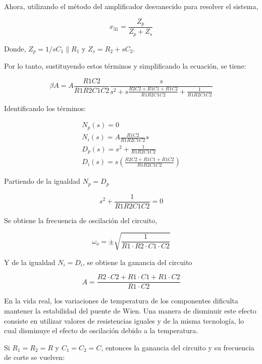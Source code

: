 Ahora, utilizando el método del amplificador desvanecido para resolver el sistema,

\begin{equation}
  x_{31} = \frac{Z_p}{Z_p + Z_s}
\end{equation}

Donde, $Z_p= 1/sC_1 \parallel R_1$ y $Z_s=R_2 + sC_2$.

Por lo tanto, sustituyendo estos términos y simplificando la ecuación, se tiene:

\begin{equation}
  \beta A = A \frac{R1C2}{R1R2C1C2} \frac{s}{s^2 + s \frac{R2C2 + R1C1 + R1C2}{R1R2C1C2} + \frac{1}{R1R2C1C2}}
\end{equation}

Identificando los términos:


\begin{align}
  N_p(s) = 0 \\
  N_i(s) = A \frac{R1C2}{R1R2C1C2}s \\
  D_p(s) = s^2 + \frac{1}{R1R2C1C2} \\
  D_i(s) = s \left( \frac{R2C2 + R1C1 + R1C2}{R1R2C1C2} \right)
\end{align}

Partiendo de la igualdad $N_p = D_p$


\begin{equation}
  s^2 + \frac{1}{R1R2C1C2} = 0
\end{equation}

Se obtiene la frecuencia de oscilación del circuito,

\begin{equation}
  \omega_o = \pm \sqrt{\frac{1}{R1 \cdot R2 \cdot C1 \cdot C2}}
\end{equation}

Y de la igualdad $N_i = D_i$, se obtiene la ganancia del circuito

\begin{equation}
  A = \frac{R2 \cdot C2 + R1 \cdot C1 + R1 \cdot C2}{R1 \cdot C2}
\end{equation}

En la vida real, los variaciones de temperatura de los componentes dificulta mantener la estabilidad del puente de Wien. Una manera de disminuir este efecto consiste en utilizar valores de resistencias iguales y de la misma tecnología, lo cual disminuye el efecto de oscilación debido a la temperatura.

Si $R_1 = R_2 = R$ y $C_1 = C_2 = C$, entonces la ganancia del circuito y su frecuencia de corte se vuelven:

